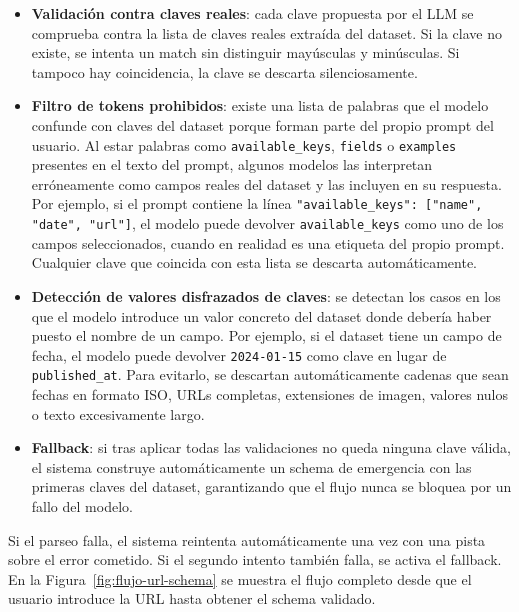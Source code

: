\begin{itemize}
    \item \textbf{Validación contra claves reales}: cada clave propuesta por el LLM se comprueba contra la lista de claves reales extraída del dataset. Si la clave no existe, se intenta un match sin distinguir mayúsculas y minúsculas. Si tampoco hay coincidencia, la clave se descarta silenciosamente.

    \item \textbf{Filtro de tokens prohibidos}: existe una lista de palabras que 
    el modelo confunde con claves del dataset porque forman parte del propio prompt del usuario. 
    Al estar palabras como \texttt{available\_keys}, \texttt{fields} o 
    \texttt{examples} presentes en el texto del prompt, algunos modelos las 
    interpretan erróneamente como campos reales del dataset y las incluyen en su 
    respuesta. Por ejemplo, si el prompt contiene la línea 
    \texttt{"available\_keys": ["name", "date", "url"]}, el modelo puede devolver 
    \texttt{available\_keys} como uno de los campos seleccionados, cuando en 
    realidad es una etiqueta del propio prompt. Cualquier clave que coincida con 
    esta lista se descarta automáticamente.
    
    \item \textbf{Detección de valores disfrazados de claves}: se detectan los 
    casos en los que el modelo introduce un valor concreto del dataset donde 
    debería haber puesto el nombre de un campo. Por ejemplo, si el dataset tiene 
    un campo de fecha, el modelo puede devolver \texttt{2024-01-15} como clave 
    en lugar de \texttt{published\_at}. Para evitarlo, se descartan 
    automáticamente cadenas que sean fechas en formato ISO, URLs completas, 
    extensiones de imagen, valores nulos o texto excesivamente largo.
    
    \item \textbf{Fallback}: si tras aplicar todas las validaciones no queda ninguna clave válida, el sistema construye automáticamente un schema de emergencia con las primeras claves del dataset, garantizando que el flujo nunca se bloquea por un fallo del modelo.
\end{itemize}

Si el parseo falla, el sistema reintenta automáticamente una vez con una pista sobre el error cometido. Si el segundo intento también falla, se activa el fallback. En la Figura~\ref{fig:flujo-url-schema} se muestra el flujo completo desde que el usuario introduce la URL hasta obtener el schema validado.

